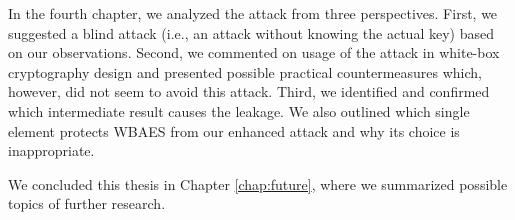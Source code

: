 In the fourth chapter, we analyzed the attack from three perspectives. First, we suggested a blind attack (i.e., an attack without knowing the actual key) based on our observations. Second, we commented on usage of the attack in white-box cryptography design and presented possible practical countermeasures which, however, did not seem to avoid this attack. Third, we identified and confirmed which intermediate result causes the leakage. We also outlined which single element protects WBAES from our enhanced attack and why its choice is inappropriate.

We concluded this thesis in Chapter \ref{chap:future}, where we summarized possible topics of further research.
